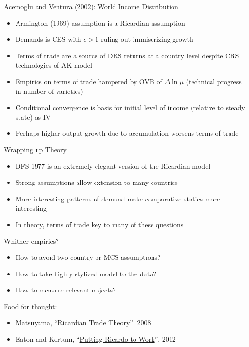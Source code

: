 \documentclass[10pt,notes=hide]{beamer}
\begin{document}
\begin{frame}{Acemoglu and Ventura (2002): World Income Distribution}
\begin{itemize}
	\item Armington (1969) assumption is a Ricardian assumption
	\item Demands is CES with $\epsilon>1$ ruling out immiserizing growth
	\item Terms of trade are a source of DRS returns at a country level despite CRS technologies of AK model
	\item Empirics on terms of trade hampered by OVB of $\Delta\ln\mu$ (technical progress in number of varieties)
	\item Conditional convergence is basis for initial level of income (relative to steady state) as IV
	\item Perhaps higher output growth due to accumulation worsens terms of trade
\end{itemize}
\end{frame}
\begin{frame}{Wrapping up}
Theory
\begin{itemize}
	\item DFS 1977 is an extremely elegant version of the Ricardian model
	\item Strong assumptions allow extension to many countries
	\item More interesting patterns of demand make comparative statics more interesting
	\item In theory, terms of trade key to many of these questions
\end{itemize}
Whither empirics?
\begin{itemize}
	\item How to avoid two-country or MCS assumptions?
	\item How to take highly stylized model to the data?
	\item How to measure relevant objects?
\end{itemize}
Food for thought:
\begin{itemize}
	\item Matsuyama, ``\href{http://faculty.wcas.northwestern.edu/\~kmatsu/Ricardian\%20Trade\%20Theory.pdf}{Ricardian Trade Theory}'', 2008
	\item Eaton and Kortum, ``\href{https://www.aeaweb.org/articles?id=10.1257/jep.26.2.65}{Putting Ricardo to Work}'', 2012
\end{itemize}
\end{frame}
\end{document}
